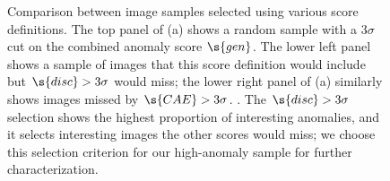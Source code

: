 \begin{figure} 
  \centering
  \caption{Comparison between image samples selected using various score definitions. The top panel of (a) shows a random sample with a 3$\sigma$ cut on the combined anomaly score $\s{gen}$. The lower left panel shows a sample of images that this score definition would include but $\s{disc}>3\sigma$ would miss; the lower right panel of (a) similarly shows images missed by $\s{CAE}>3\sigma$. . The $\s{disc}>3\sigma$ selection shows the highest proportion of interesting anomalies, and it selects interesting images the other scores would miss; we choose this selection criterion for our high-anomaly sample for further characterization.}
  \label{fig:score_effect}
\end{figure}

